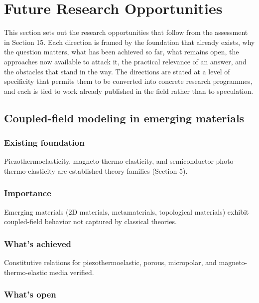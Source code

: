 \section{Future Research Opportunities}
\label{sec:future}

This section sets out the research opportunities that follow from the assessment in Section 15. Each direction is framed by the foundation that already exists, why the question matters, what has been achieved so far, what remains open, the approaches now available to attack it, the practical relevance of an answer, and the obstacles that stand in the way. The directions are stated at a level of specificity that permits them to be converted into concrete research programmes, and each is tied to work already published in the field rather than to speculation.

\subsection{Coupled-field modeling in emerging materials}
\label{sec:16.1}

\subsubsection{Existing foundation}

Piezothermoelasticity, magneto-thermo-elasticity, and semiconductor photo-thermo-elasticity are established theory families (Section 5).

\subsubsection{Importance}

Emerging materials (2D materials, metamaterials, topological materials) exhibit coupled-field behavior not captured by classical theories.

\subsubsection{What's achieved}

Constitutive relations for piezothermoelastic, porous, micropolar, and magneto-thermo-elastic media verified.

\subsubsection{What's open}

